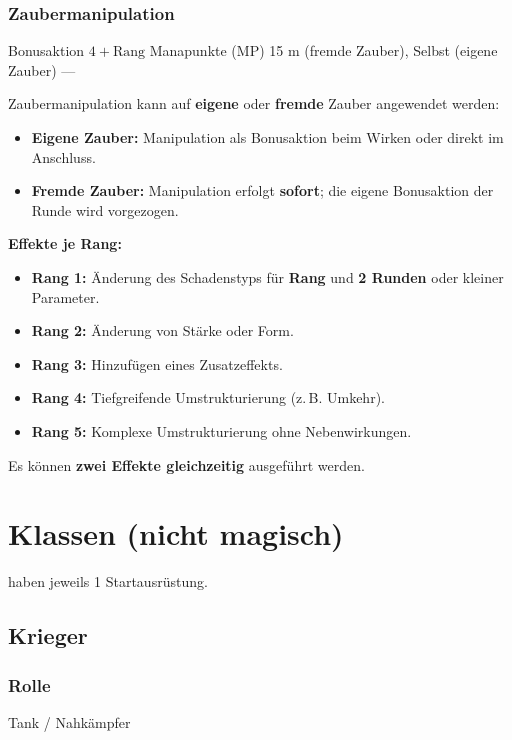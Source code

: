 \subsubsection*{Zaubermanipulation}

\spellcard
{}
{Bonusaktion}
{$4 + \text{Rang}$ Manapunkte (MP)}
{15 m (fremde Zauber), Selbst (eigene Zauber)}
{—}
{
	Zaubermanipulation kann auf \textbf{eigene} oder \textbf{fremde} Zauber angewendet werden:
	\begin{itemize}
		\item \textbf{Eigene Zauber:} Manipulation als Bonusaktion beim Wirken
		oder direkt im Anschluss.
		\item \textbf{Fremde Zauber:} Manipulation erfolgt \textbf{sofort};
		die eigene Bonusaktion der Runde wird vorgezogen.
	\end{itemize}
	
	\vspace{4pt}
	\textbf{Effekte je Rang:}
	\begin{itemize}
		\item \textbf{Rang 1:} Änderung des Schadenstyps für \textbf{Rang} und
		\textbf{2 Runden} oder kleiner Parameter.
		\item \textbf{Rang 2:} Änderung von Stärke oder Form.
		\item \textbf{Rang 3:} Hinzufügen eines Zusatzeffekts.
		\item \textbf{Rang 4:} Tiefgreifende Umstrukturierung (z.\,B. Umkehr).
		\item \textbf{Rang 5:} Komplexe Umstrukturierung ohne Nebenwirkungen.
	\end{itemize}
}
{
	Es können \textbf{zwei Effekte gleichzeitig} ausgeführt werden.
}

\section{Klassen (nicht magisch)}

 haben jeweils 1 Startausrüstung.

\subsection{Krieger}

\subsubsection*{Rolle}
Tank / Nahkämpfer

